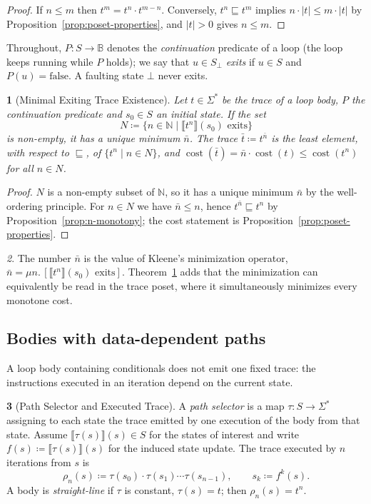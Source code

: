 \documentclass[oneside,english]{amsart}
\numberwithin{equation}{section}
\numberwithin{figure}{section}
\theoremstyle{plain}
\newtheorem{thm}{\protect\theoremname}
\theoremstyle{definition}
\newtheorem{defn}[thm]{\protect\definitionname}
\theoremstyle{plain}
\theoremstyle{remark}
\theoremstyle{plain}
\theoremstyle{definition}
\theoremstyle{plain}
\theoremstyle{remark}
\newtheorem{rem}[thm]{\protect\remarkname}
\DeclareMathOperator{\cost}{cost}
\newcommand{\sem}[1]{\llbracket #1 \rrbracket}
\providecommand{\definitionname}{Definition}
\providecommand{\remarkname}{Remark}
\providecommand{\theoremname}{Theorem}
\begin{document}
\begin{proof}
If $n \le m$ then $t^m = t^n \cdot t^{m-n}$. Conversely, $t^n \sqsubseteq t^m$ implies $n \cdot |t| \le m \cdot |t|$ by Proposition~\ref{prop:poset-properties}, and $|t| > 0$ gives $n \le m$.
\end{proof}

Throughout, $P : S \to \mathbb{B}$ denotes the \emph{continuation} predicate of a loop (the loop keeps running while $P$ holds); we say that $u \in S_\bot$ \emph{exits} if $u \in S$ and $P(u) = \text{false}$. A faulting state $\bot$ never exits.

\begin{thm}[Minimal Exiting Trace Existence]
\label{thm:minimal-trace}
Let $t \in \Sigma^*$ be the trace of a loop body, $P$ the continuation predicate and $s_0 \in S$ an initial state. If the set
\[
N \coloneqq \{ n \in \mathbb{N} \mid \sem{t^n}(s_0) \text{ exits} \}
\]
is non-empty, it has a unique minimum $\bar{n}$. The trace $\bar{t} \coloneqq t^{\bar{n}}$ is the least element, with respect to $\sqsubseteq$, of $\{ t^n \mid n \in N \}$, and $\cost(\bar{t}) = \bar{n} \cdot \cost(t) \le \cost(t^n)$ for all $n \in N$.
\end{thm}

\begin{proof}
$N$ is a non-empty subset of $\mathbb{N}$, so it has a unique minimum $\bar{n}$ by the well-ordering principle. For $n \in N$ we have $\bar n \le n$, hence $t^{\bar{n}} \sqsubseteq t^{n}$ by Proposition~\ref{prop:n-monotony}; the cost statement is Proposition~\ref{prop:poset-properties}.
\end{proof}

\begin{rem}
The number $\bar{n}$ is the value of Kleene's minimization operator, $\bar{n} = \mu n.\, [\sem{t^n}(s_0) \text{ exits}]$. Theorem~\ref{thm:minimal-trace} adds that the minimization can equivalently be read in the trace poset, where it simultaneously minimizes every monotone cost.
\end{rem}

\subsection{Bodies with data-dependent paths}

A loop body containing conditionals does not emit one fixed trace: the instructions executed in an iteration depend on the current state.

\begin{defn}[Path Selector and Executed Trace]\label{def:path-selector}
A \textit{path selector} is a map $\tau : S \to \Sigma^*$ assigning to each state the trace emitted by one execution of the body from that state. Assume $\sem{\tau(s)}(s) \in S$ for the states of interest and write $f(s) \coloneqq \sem{\tau(s)}(s)$ for the induced state update. The trace executed by $n$ iterations from $s$ is
\[
\rho_n(s) \coloneqq \tau(s_0) \cdot \tau(s_1) \cdots \tau(s_{n-1}), \qquad s_k \coloneqq f^k(s).
\]
A body is \textit{straight-line} if $\tau$ is constant, $\tau(s) = t$; then $\rho_n(s) = t^n$.
\end{defn}
\end{document}
